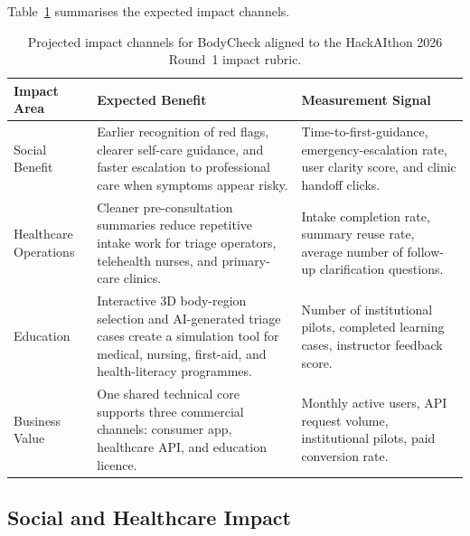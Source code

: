 Table~\ref{tab:impact_matrix} summarises the expected impact channels.

\begin{table}[h!]
  \centering
  \caption{Projected impact channels for BodyCheck aligned to the
    HackAIthon 2026 Round~1 impact rubric.}
  \label{tab:impact_matrix}
  \setlength{\tabcolsep}{5pt}
  \renewcommand{\arraystretch}{1.45}
  \small
  \begin{tabular}{@{} p{3.0cm} p{4.6cm} p{4.7cm} @{}}
    \toprule
    \textbf{Impact Area} &
    \textbf{Expected Benefit} &
    \textbf{Measurement Signal} \\
    \midrule

    Social Benefit &
    Earlier recognition of red flags, clearer self-care guidance, and
    faster escalation to professional care when symptoms appear risky. &
    Time-to-first-guidance, emergency-escalation rate, user clarity score,
    and clinic handoff clicks. \\

    Healthcare Operations &
    Cleaner pre-consultation summaries reduce repetitive intake work for
    triage operators, telehealth nurses, and primary-care clinics. &
    Intake completion rate, summary reuse rate, average number of follow-up
    clarification questions. \\

    Education &
    Interactive 3D body-region selection and AI-generated triage cases create
    a simulation tool for medical, nursing, first-aid, and health-literacy
    programmes. &
    Number of institutional pilots, completed learning cases, instructor
    feedback score. \\

    Business Value &
    One shared technical core supports three commercial channels: consumer
    app, healthcare API, and education licence. &
    Monthly active users, API request volume, institutional pilots, paid
    conversion rate. \\

    \bottomrule
  \end{tabular}
\end{table}

\subsection{Social and Healthcare Impact}
\label{sec:impact-social}



